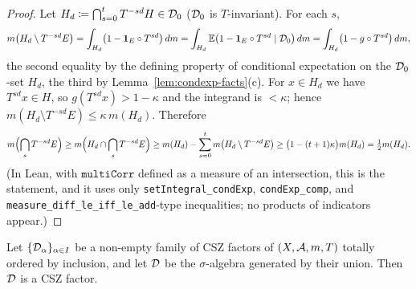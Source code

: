 \begin{proof}
  \leanok
  Let $H_d \coloneqq \bigcap_{s=0}^{t} T^{-sd}H \in \mathcal{D}_0$ ($\mathcal{D}_0$ is $T$-invariant).  For
  each $s$,
  \[
    m\bigl(H_d \setminus T^{-sd}E\bigr) = \int_{H_d} \bigl(1 - \mathbf{1}_E \circ T^{sd}\bigr)\,dm
      = \int_{H_d} \mathbb{E}\bigl(1 - \mathbf{1}_E\circ T^{sd} \mid \mathcal{D}_0\bigr)\,dm
      = \int_{H_d} \bigl(1 - g \circ T^{sd}\bigr)\,dm ,
  \]
  the second equality by the defining property of conditional expectation on the
  $\mathcal{D}_0$-set $H_d$, the third by Lemma~\ref{lem:condexp-facts}(c).  For $x \in H_d$ we have
  $T^{sd}x \in H$, so $g(T^{sd}x) > 1 - \kappa$ and the integrand is $< \kappa$; hence
  $m(H_d \setminus T^{-sd}E) \leq \kappa\, m(H_d)$.  Therefore
  \[
    m\Bigl(\bigcap_{s} T^{-sd}E\Bigr) \geq m\Bigl(H_d \cap \bigcap_{s} T^{-sd}E\Bigr)
      \geq m(H_d) - \sum_{s=0}^{t} m\bigl(H_d \setminus T^{-sd}E\bigr)
      \geq \bigl(1 - (t+1)\kappa\bigr) m(H_d) = \tfrac12 m(H_d) .
  \]
  (In Lean, with $\texttt{multiCorr}$ defined as a measure of an intersection, this is the
  statement, and it uses only \texttt{setIntegral\_condExp}, \texttt{condExp\_comp}, and
  \texttt{measure\_diff\_le\_iff\_le\_add}-type inequalities; no products of indicators appear.)
\end{proof}

\begin{lemma}[Chains]
  \label{lem:chain}
  \leanok
  Let $\{\mathcal{D}_\alpha\}_{\alpha \in I}$ be a non-empty family of CSZ factors of $(X,\mathcal{A},m,T)$
  totally ordered by inclusion, and let $\mathcal{D}$ be the $\sigma$-algebra generated by their union.
  Then $\mathcal{D}$ is a CSZ factor.
\end{lemma}

